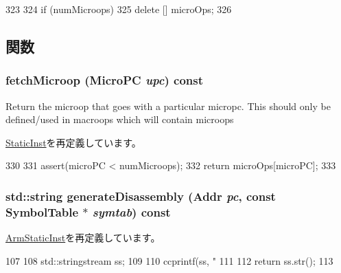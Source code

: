 \begin{DoxyCode}
323     {
324         if (numMicroops)
325             delete [] microOps;
326     }
\end{DoxyCode}


\subsection{関数}
\hypertarget{classArmISA_1_1PredMacroOp_ae9e7acd6304ee397f1ab470e283ae76b}{
\subsubsection[{fetchMicroop}]{ fetchMicroop ({\bf MicroPC} {\em upc}) const}}
\label{classArmISA_1_1PredMacroOp_ae9e7acd6304ee397f1ab470e283ae76b}
Return the microop that goes with a particular micropc. This should only be defined/used in macroops which will contain microops 

\hyperlink{classStaticInst_aa5c7e6f7323850b84dbf5b8e47856173}{StaticInst}を再定義しています。


\begin{DoxyCode}
330     {
331         assert(microPC < numMicroops);
332         return microOps[microPC];
333     }
\end{DoxyCode}
\hypertarget{classArmISA_1_1PredMacroOp_a95d323a22a5f07e14d6b4c9385a91896}{
\subsubsection[{generateDisassembly}]{\setlength{\rightskip}{0pt plus 5cm}std::string generateDisassembly ({\bf Addr} {\em pc}, \/  const SymbolTable $\ast$ {\em symtab}) const}}
\label{classArmISA_1_1PredMacroOp_a95d323a22a5f07e14d6b4c9385a91896}


\hyperlink{classArmISA_1_1ArmStaticInst_a95d323a22a5f07e14d6b4c9385a91896}{ArmStaticInst}を再定義しています。


\begin{DoxyCode}
107 {
108     std::stringstream ss;
109 
110     ccprintf(ss, "%
111 
112     return ss.str();
113 }
\end{DoxyCode}



